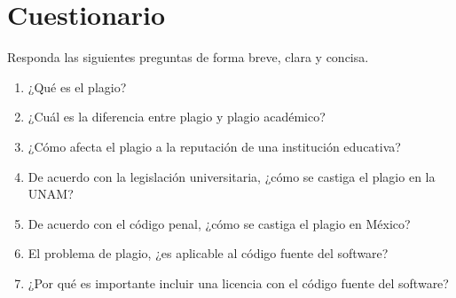 \documentclass[letterpaper,10.5pt]{article}
\begin{document}
\section{Cuestionario}
Responda las siguientes preguntas de forma breve, clara y concisa.
\label{sec:cuestionario} %
\begin{enumerate}[noitemsep]
	\item ¿Qué es el plagio?
	\item ¿Cuál es la diferencia entre plagio y plagio académico?
	\item ¿Cómo afecta el plagio a la reputación de una institución educativa?
	\item De acuerdo con la legislación universitaria, ¿cómo se castiga el plagio en la UNAM? %
	\item De acuerdo con el código penal, ¿cómo se castiga el plagio en México?
	\item El problema de plagio, ¿es aplicable al código fuente del software?
	\item ¿Por qué es importante incluir una licencia con el código fuente del software?
\end{enumerate}
\end{document}
